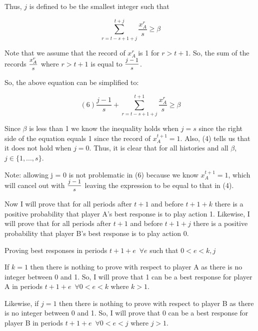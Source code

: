 \documentclass{article}
\begin{document}
\vskip12pt

Thus, $j$ is defined to be the smallest integer such that

$$ \sum\limits_{r=t-s+1+j}^{t+j} \frac{x^r_A}{s} \geq \beta$$

Note that we assume that the record of $x^r_A$ is 1 for $r>t+1$. So, the sum of the records $\mfrac{x^r_A}{s}$ where $r>t+1$ is equal to $\mfrac{j-1}{s}$.

So, the above equation can be simplified to:

$$(6) \frac{j-1}{s}+\sum\limits_{r=t-s+1+j}^{t+1} \frac{x^r_A}{s} \geq \beta$$

 Since $\beta$ is less than 1 we know the inequality holds when $j=s$ since the right side of the equation equals 1 since the record of $x^{t+1}_A = 1$. Also, (4) tells us that it does not hold when $j=0$. Thus, it is clear that for all histories and all $\beta$, $j \in \{1,...,s\}$.
 
 \vskip6pt
 
 Note: allowing j = 0 is not problematic in (6) because we know $x^{t+1}_A = 1$, which will cancel out with $\mfrac{j-1}{s}$ leaving the expression to be equal to that in (4).

\vskip12pt

Now I will prove that for all periods after $t+1$ and before $t+1+k$ there is a positive probability that player A's best response is to play action 1. Likewise, I will prove that for all periods after $t+1$ and before $t+1+j$ there is a positive probability that player B's best response is to play action 0.

\vskip12pt

\centering

Proving best responses in periods $t+1+e \hspace{6pt} \forall e$ such that $0< e < k,j$

\vskip12pt

\raggedright
If $k = 1$ then there is nothing to prove with respect to player A as there is no integer between 0 and 1. So, I will prove that 1 can be a best response for player A in periods $t+1+e \hspace{6pt} \forall 0<e<k$ where $k > 1$.

\vskip6pt

Likewise, if $j = 1$ then there is nothing to prove with respect to player B as there is no integer between 0 and 1. So, I will prove that 0 can be a best response for player B in periods $t+1+e \hspace{6pt} \forall 0<e<j$ where $j > 1$.
\end{document}
